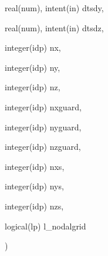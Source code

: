 {\begin{DoxyParamCaption}
\item[{real(num), intent(in)}]{dtsdy, }
\item[{real(num), intent(in)}]{dtsdz, }
\item[{integer(idp)}]{nx, }
\item[{integer(idp)}]{ny, }
\item[{integer(idp)}]{nz, }
\item[{integer(idp)}]{nxguard, }
\item[{integer(idp)}]{nyguard, }
\item[{integer(idp)}]{nzguard, }
\item[{integer(idp)}]{nxs, }
\item[{integer(idp)}]{nys, }
\item[{integer(idp)}]{nzs, }
\item[{logical(lp)}]{l\+\_\+nodalgrid}
\end{DoxyParamCaption}
)}\hypertarget{maxwell_8_f90_a6fcc54b9cc2afe01865aab5768f52215}{}\label{maxwell_8_f90_a6fcc54b9cc2afe01865aab5768f52215}
